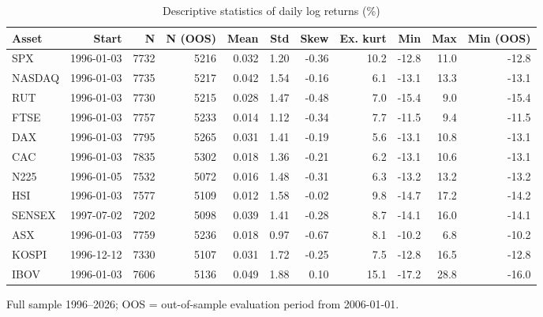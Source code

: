 \begin{table}[htbp]
\centering
\footnotesize
\caption{Descriptive statistics of daily log returns (\%)}
\label{tab:desc}
\begin{tabular}{lrrrrrrrrrr}
\toprule
Asset & Start & N & N (OOS) & Mean & Std & Skew & Ex. kurt & Min & Max & Min (OOS) \\
\midrule
SPX & 1996-01-03 & 7732 & 5216 & 0.032 & 1.20 & -0.36 & 10.2 & -12.8 & 11.0 & -12.8 \\
NASDAQ & 1996-01-03 & 7735 & 5217 & 0.042 & 1.54 & -0.16 & 6.1 & -13.1 & 13.3 & -13.1 \\
RUT & 1996-01-03 & 7730 & 5215 & 0.028 & 1.47 & -0.48 & 7.0 & -15.4 & 9.0 & -15.4 \\
FTSE & 1996-01-03 & 7757 & 5233 & 0.014 & 1.12 & -0.34 & 7.7 & -11.5 & 9.4 & -11.5 \\
DAX & 1996-01-03 & 7795 & 5265 & 0.031 & 1.41 & -0.19 & 5.6 & -13.1 & 10.8 & -13.1 \\
CAC & 1996-01-03 & 7835 & 5302 & 0.018 & 1.36 & -0.21 & 6.2 & -13.1 & 10.6 & -13.1 \\
N225 & 1996-01-05 & 7532 & 5072 & 0.016 & 1.48 & -0.31 & 6.3 & -13.2 & 13.2 & -13.2 \\
HSI & 1996-01-03 & 7577 & 5109 & 0.012 & 1.58 & -0.02 & 9.8 & -14.7 & 17.2 & -14.2 \\
SENSEX & 1997-07-02 & 7202 & 5098 & 0.039 & 1.41 & -0.28 & 8.7 & -14.1 & 16.0 & -14.1 \\
ASX & 1996-01-03 & 7759 & 5236 & 0.018 & 0.97 & -0.67 & 8.1 & -10.2 & 6.8 & -10.2 \\
KOSPI & 1996-12-12 & 7330 & 5107 & 0.031 & 1.72 & -0.25 & 7.5 & -12.8 & 16.5 & -12.8 \\
IBOV & 1996-01-03 & 7606 & 5136 & 0.049 & 1.88 & 0.10 & 15.1 & -17.2 & 28.8 & -16.0 \\
\bottomrule
\end{tabular}
\par\smallskip\parbox{\linewidth}{\scriptsize Full sample 1996--2026; OOS = out-of-sample evaluation period from 2006-01-01.}
\end{table}
